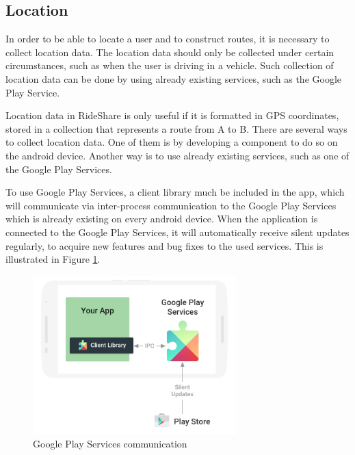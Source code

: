 \subsection{Location}
In order to be able to locate a user and to construct routes, it is necessary to collect location data. 
The location data should only be collected under certain circumstances, such as when the user is driving in a vehicle. 
Such collection of location data can be done by using already existing services, such as the Google Play Service.

Location data in RideShare is only useful if it is formatted in GPS coordinates, stored in a collection that represents a route from A to B.
There are several ways to collect location data. 
One of them is by developing a component to do so on the android device. 
Another way is to use already existing services, such as one of the Google Play Services.

To use Google Play Services, a client library much be included in the app, which will communicate via inter-process communication to the Google Play Services which is already existing on every android device. 
When the application is connected to the Google Play Services, it will automatically receive silent updates regularly, to acquire new features and bug fixes to the used services. 
This is illustrated in Figure \ref{fig:gapifigure}\cite{GapiOverview}.

\begin{figure}[h]
	\centering
	\includegraphics[width=0.7\textwidth]{figures/play-services-diagram.png}
	\caption{Google Play Services communication\cite{GapiFigure}}
	\label{fig:gapifigure}
\end{figure}

